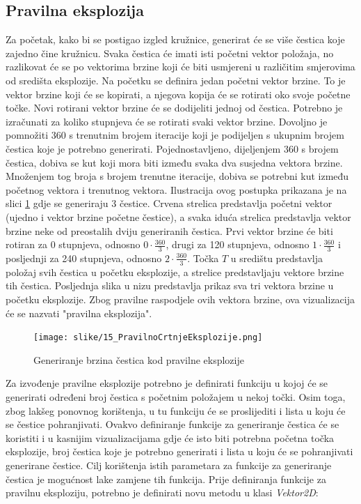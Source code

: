 \documentclass{foi}
\begin{document}
\subsection{Pravilna eksplozija}
Za početak, kako bi se postigao izgled kružnice, generirat će se više čestica koje zajedno čine kružnicu. Svaka čestica će imati isti početni vektor položaja, no razlikovat će se po vektorima brzine koji će biti usmjereni u različitim smjerovima od središta eksplozije. Na početku se definira jedan početni vektor brzine. To je vektor brzine koji će se kopirati, a njegova kopija će se rotirati oko svoje početne točke. Novi rotirani vektor brzine će se dodijeliti jednoj od čestica. Potrebno je izračunati za koliko stupnjeva će se rotirati svaki vektor brzine. Dovoljno je pomnožiti 360 s trenutnim brojem iteracije koji je podijeljen s ukupnim brojem čestica koje je potrebno generirati. Pojednostavljeno, dijeljenjem 360 s brojem čestica, dobiva se kut koji mora biti između svaka dva susjedna vektora brzine. Množenjem tog broja s brojem trenutne iteracije, dobiva se potrebni kut između početnog vektora i trenutnog vektora. Ilustracija ovog postupka prikazana je na slici \ref{fig:PravilnoCrtnjeEksplozije} gdje se generiraju 3 čestice. Crvena strelica predstavlja početni vektor (ujedno i vektor brzine početne čestice), a svaka iduća strelica predstavlja vektor brzine neke od preostalih dviju generiranih čestica. Prvi vektor brzine će biti rotiran za 0 stupnjeva, odnosno $0 \cdot \frac{360}{3}$, drugi za 120 stupnjeva, odnosno $1 \cdot \frac{360}{3}$ i posljednji za 240 stupnjeva, odnosno $2 \cdot \frac{360}{3}$. Točka $T$ u središtu predstavlja položaj svih čestica u početku eksplozije, a strelice predstavljaju vektore brzine tih čestica. Posljednja slika u nizu predstavlja prikaz sva tri vektora brzine u početku eksplozije. Zbog pravilne raspodjele ovih vektora brzine, ova vizualizacija će se nazvati "pravilna eksplozija".

\begin{figure}[H]
    \centering
    \texttt{[image: slike/15\_PravilnoCrtnjeEksplozije.png]}
    \captionsetup{justification=centering}
    \caption{Generiranje brzina čestica kod pravilne eksplozije}
\label{fig:PravilnoCrtnjeEksplozije}
\end{figure}

Za izvođenje pravilne eksplozije potrebno je definirati funkciju u kojoj će se generirati određeni broj čestica s početnim položajem u nekoj točki. Osim toga, zbog lakšeg ponovnog korištenja, u tu funkciju će se proslijediti i lista u koju će se čestice pohranjivati. Ovakvo definiranje funkcije za generiranje čestica će se koristiti i u kasnijim vizualizacijama gdje će isto biti potrebna početna točka eksplozije, broj čestica koje je potrebno generirati i lista u koju će se pohranjivati generirane čestice. Cilj korištenja istih parametara za funkcije za generiranje čestica je mogućnost lake zamjene tih funkcija. Prije definiranja funkcije za pravilnu eksploziju, potrebno je definirati novu metodu u klasi \textit{Vektor2D}:
\end{document}
